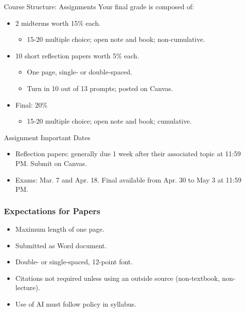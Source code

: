 \documentclass[handout]{beamer}
\begin{document}
\begin{frame}{\LARGE Course Structure: Assignments}
	Your final grade is composed of: 
	\begin{itemize}
		\item 2 midterms worth 15\% each.
		\begin{itemize}
			\item 15-20 multiple choice; open note and book; non-cumulative.
		\end{itemize}
		\item 10 short reflection papers worth 5\% each.
		\begin{itemize}
			\item One page, single- or double-spaced.
			\item Turn in 10 out of 13 prompts; posted on Canvas.
		\end{itemize}
		\item Final: 20\%
		\begin{itemize}
			\item 15-20 multiple choice; open note and book; cumulative.
		\end{itemize}
	\end{itemize}
\end{frame}


\begin{frame}{\LARGE Assignment Important Dates}
	\begin{itemize}
		\item Reflection papers: generally due 1 week after their associated topic at 11:59 PM. Submit on Canvas.
		\item Exams: Mar. 7 and Apr. 18. Final available from Apr. 30 to May 3 at 11:59 PM. 
	\end{itemize}
\end{frame}

\begin{frame} 
	\frametitle{\LARGE{Expectations for Papers}}
	\begin{itemize}
		\item Maximum length of one page.
		\item Submitted as Word document.
		\item Double- or single-spaced, 12-point font.
		\item Citations not required unless using an outside source (non-textbook, non-lecture).
		\item Use of AI must follow policy in syllabus.
	\end{itemize}
\end{frame}
\end{document}
